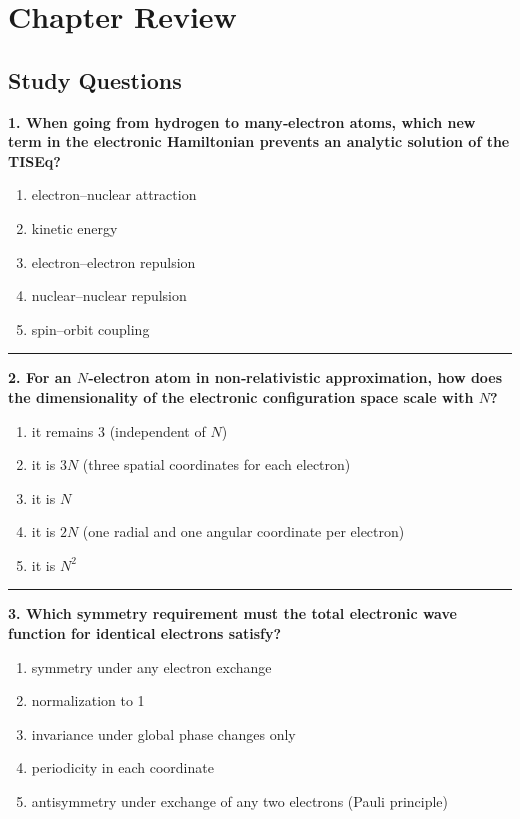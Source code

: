 \documentclass[
  english,
  9pt,
]{extbook}
\providecommand{\tightlist}{%
  \setlength{\itemsep}{0pt}\setlength{\parskip}{0pt}}
\theoremstyle{definition}
\theoremstyle{definition}
\theoremstyle{definition}
\theoremstyle{definition}
\theoremstyle{remark}
\begin{document}
\section{Chapter Review}\label{rev9}

\subsection{Study Questions}\label{quest9}

\textbf{1. When going from hydrogen to many‑electron atoms, which new term in the electronic Hamiltonian prevents an analytic solution of the TISEq?}

\begin{enumerate}
\def\labelenumi{\alph{enumi}.}
\tightlist
\item
  electron--nuclear attraction
\item
  kinetic energy
\item
  electron--electron repulsion
\item
  nuclear--nuclear repulsion
\item
  spin--orbit coupling
\end{enumerate}

\begin{center}\rule{0.5\linewidth}{0.5pt}\end{center}

\textbf{2. For an \(N\)‑electron atom in non‑relativistic approximation, how does the dimensionality of the electronic configuration space scale with \(N\)?}

\begin{enumerate}
\def\labelenumi{\alph{enumi}.}
\tightlist
\item
  it remains 3 (independent of \(N\))
\item
  it is \(3N\) (three spatial coordinates for each electron)
\item
  it is \(N\)
\item
  it is \(2N\) (one radial and one angular coordinate per electron)
\item
  it is \(N^2\)
\end{enumerate}

\begin{center}\rule{0.5\linewidth}{0.5pt}\end{center}

\textbf{3. Which symmetry requirement must the total electronic wave function for identical electrons satisfy?}

\begin{enumerate}
\def\labelenumi{\alph{enumi}.}
\tightlist
\item
  symmetry under any electron exchange
\item
  normalization to 1
\item
  invariance under global phase changes only
\item
  periodicity in each coordinate
\item
  antisymmetry under exchange of any two electrons (Pauli principle)
\end{enumerate}
\end{document}
